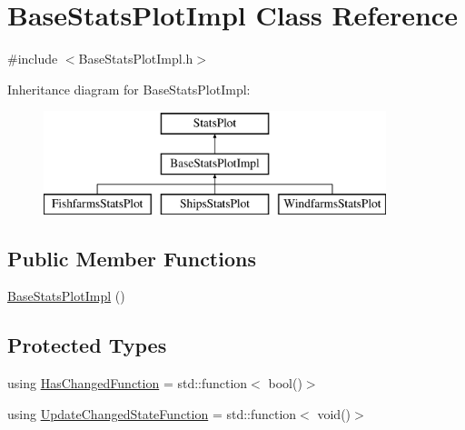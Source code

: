 \hypertarget{class_base_stats_plot_impl}{}\section{Base\+Stats\+Plot\+Impl Class Reference}
\label{class_base_stats_plot_impl}


{\ttfamily \#include $<$Base\+Stats\+Plot\+Impl.\+h$>$}

Inheritance diagram for Base\+Stats\+Plot\+Impl\+:\begin{figure}[H]
\begin{center}
\leavevmode
\includegraphics[height=3.000000cm]{d9/d2b/class_base_stats_plot_impl}
\end{center}
\end{figure}
\subsection*{Public Member Functions}
\begin{DoxyCompactItemize}
\item 
\mbox{\hyperlink{class_base_stats_plot_impl_a8598dedaae4f37264f53d191efdeb671}{Base\+Stats\+Plot\+Impl}} ()
\end{DoxyCompactItemize}
\subsection*{Protected Types}
\begin{DoxyCompactItemize}
\item 
using \mbox{\hyperlink{class_base_stats_plot_impl_a948f49df97d1bd9824b08d6aeb83b3c7}{Has\+Changed\+Function}} = std\+::function$<$ bool()$>$
\item 
using \mbox{\hyperlink{class_base_stats_plot_impl_a906285829f153a9f28fb245213a2916a}{Update\+Changed\+State\+Function}} = std\+::function$<$ void()$>$
\end{DoxyCompactItemize}
